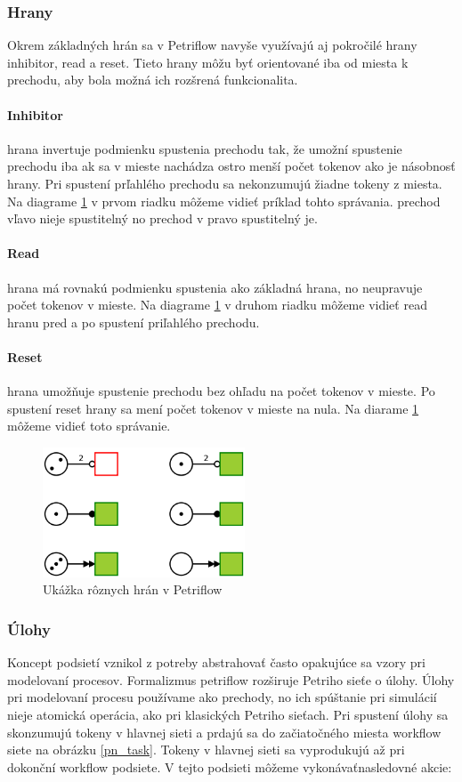 \subsubsection{Hrany}
Okrem základných hrán sa v Petriflow navyše využívajú aj pokročilé hrany inhibitor, read a reset. Tieto hrany môžu byť orientované iba od miesta k prechodu, aby bola možná ich rozšrená funkcionalita.
\paragraph{Inhibitor} hrana invertuje  podmienku spustenia prechodu tak, že umožní spustenie prechodu iba ak sa v mieste nachádza ostro menší počet tokenov ako je násobnosť hrany. Pri spustení prľahlého prechodu sa nekonzumujú žiadne tokeny z miesta. Na diagrame  \ref{pn_arc_types} v prvom riadku môžeme vidieť príklad tohto správania. prechod vľavo nieje spustitelný no prechod v pravo spustitelný je. 

\paragraph{Read} hrana má rovnakú podmienku spustenia ako základná hrana, no neupravuje počet tokenov v mieste. Na diagrame  \ref{pn_arc_types} v druhom riadku môžeme vidieť read hranu pred a po spustení priľahlého prechodu. 
 
\paragraph{Reset} hrana umožňuje spustenie prechodu bez ohľadu na počet tokenov v mieste. Po spustení reset hrany sa mení počet tokenov v mieste na nula. Na diarame \ref{pn_arc_types} môžeme vidieť toto správanie.

\begin{figure}[!htbp]
\centering
\includegraphics[width=6cm]{img/pn_arc_types.png}
\caption{Ukážka rôznych hrán v Petriflow}
\label{pn_arc_types}
\end{figure}

\subsubsection{Úlohy}
Koncept podsietí vznikol z potreby abstrahovať často opakujúce sa vzory pri modelovaní procesov. Formalizmus petriflow rozširuje Petriho sieťe o úlohy. Úlohy pri modelovaní procesu používame ako prechody, no ich spúštanie pri simulácií nieje atomická operácia, ako pri klasických Petriho sieťach. Pri spustení úlohy sa skonzumujú tokeny v hlavnej sieti a prdajú sa do začiatočného miesta workflow siete na obrázku  \ref{pn_task}. Tokeny v hlavnej sieti sa vyprodukujú až pri dokonční workflow podsiete. V tejto podsieti môžeme vykonávaťnasledovné akcie: 

